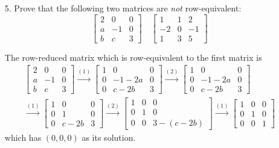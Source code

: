 \documentclass{article}
\begin{document}
\begin{enumerate}[listparindent=\parindent]
\item[5.] Prove that the following two matrices are \textit{not} row-equivalent:
    \[
        \begin{bmatrix}
            2 & 0 & 0 \\
            a & -1 & 0 \\
            b & c & 3
        \end{bmatrix}
        \quad
        \begin{bmatrix}
            1 & 1 & 2 \\
            -2 & 0 & -1 \\
            1 & 3 & 5
        \end{bmatrix}
    \]

The row-reduced matrix which is row-equivalent to the first matrix is
\begin{gather*}
    \begin{bmatrix}
        2 & 0 & 0 \\
        a & -1 & 0 \\
        b & c & 3
    \end{bmatrix}
    \xrightarrow{(1)}
    \begin{bmatrix}
        1 & 0 & 0 \\
        0 & -1 - 2a & 0 \\
        0 & c - 2b & 3
    \end{bmatrix}
    \xrightarrow{(2)}
    \begin{bmatrix}
        1 & 0 & 0 \\
        0 & -1 - 2a & 0 \\
        0 & c - 2b & 3
    \end{bmatrix}
    \\
    \xrightarrow{(1)}
    \begin{bmatrix}
        1 & 0 & 0 \\
        0 & 1 & 0 \\
        0 & c - 2b & 3
    \end{bmatrix}
    \xrightarrow{(2)}
    \begin{bmatrix}
        1 & 0 & 0 \\
        0 & 1 & 0 \\
        0 & 0 & 3 - (c - 2b)
    \end{bmatrix}
    \xrightarrow{(1)}
    \boxed{
        \begin{bmatrix}
            1 & 0 & 0 \\
            0 & 1 & 0 \\
            0 & 0 & 1
        \end{bmatrix}
    }
\end{gather*}
which has \( (0, 0, 0) \) as its solution.


\end{enumerate}
\end{document}
